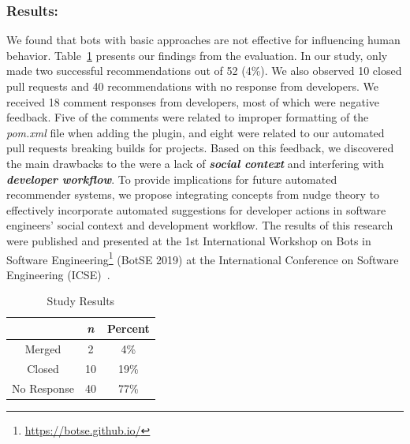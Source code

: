 \subsubsection{Results:} 

We found that bots with basic approaches are not effective for influencing human behavior. Table~\ref{tab:sorry_results} presents our findings from the evaluation. In our study, \tele only made two successful recommendations out of 52 (4\%). We also observed 10 closed pull requests and 40 recommendations with no response from developers. We received 18 comment responses from developers, most of which were negative feedback. Five of the comments were related to improper formatting of the \textit{pom.xml} file when adding the \EP plugin, and eight were related to our automated pull requests breaking builds for projects. Based on this feedback, we discovered the main drawbacks to the \tele were a lack of \textit{\textbf{social context}} and interfering with \textit{\textbf{developer workflow}}. To provide implications for future automated recommender systems, we propose integrating concepts from nudge theory to effectively incorporate automated suggestions for developer actions in software engineers' social context and development workflow. The results of this research were published and presented at the 1st International Workshop on Bots in Software Engineering\footnote{\url{https://botse.github.io/}} (BotSE 2019) at the International Conference on Software Engineering (ICSE)~\cite{BotSE}.

\begin{table}[H]
\centering
\begin{tabular}{ |c|c|c| } \hline
  & \textit{\textbf{n}} & \textbf{Percent} \\ \hline
 Merged & 2 & 4\% \\ \hline 
 Closed & 10 & 19\% \\ \hline
 No Response & 40 & 77\%\\ \hline 
\end{tabular}
\caption{\sorry Study Results}
\label{tab:sorry_results}
\end{table}

